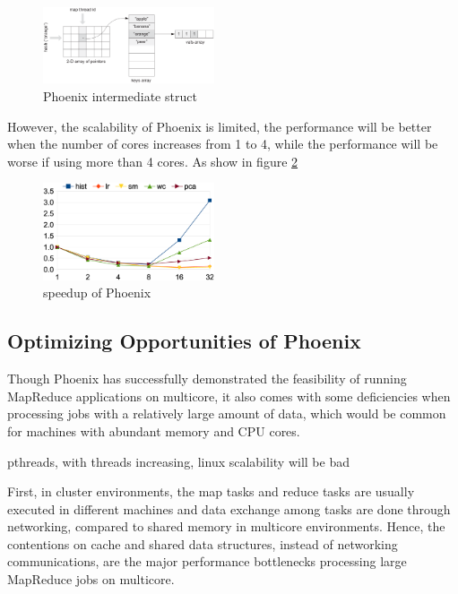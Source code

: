 \begin{figure}[!h!t]  
    \centering
    \includegraphics[width=0.45\textwidth]{eps/phoenix_intermediate.eps}
    \caption{Phoenix intermediate struct}
    \label{fig:phoenix:intermediate}
\end{figure}


However, the scalability of Phoenix is limited, the performance will be
better when the number of cores increases from 1 to 4, while the performance will be
worse if using more than 4 cores. As show in figure \ref{fig:phoenix:speedup}

\begin{figure}[!h!t]  
    \centering
    \includegraphics[width=0.45\textwidth]{eps/phoenix_speedup.eps}
    \caption{speedup of Phoenix}
    \label{fig:phoenix:speedup}
\end{figure}


\subsection{Optimizing Opportunities of Phoenix}
Though Phoenix has successfully demonstrated the feasibility
of running MapReduce applications on multicore, 
it also comes with some deficiencies when processing jobs with a relatively large
amount of data, which would be common for machines with abundant memory and CPU cores.



{\color{blue} pthreads, with threads increasing, linux scalability will be bad}

First, in cluster environments, 
the map tasks and reduce tasks are usually 
executed in different machines and data exchange among
tasks are done through networking, 
compared to shared memory in multicore environments. 
Hence, the contentions on cache and shared data structures, 
instead of networking communications, 
are the major performance bottlenecks processing large MapReduce jobs on multicore.

